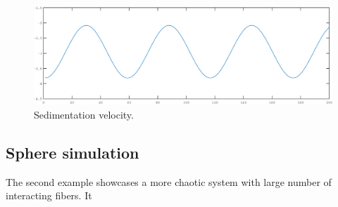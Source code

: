 \documentclass[a4paper,11pt]{kth-mag}
\begin{document}
\begin{figure}
  \centering
  \includegraphics[width=\textwidth]{img/ring_sedimentation.pdf}
  \caption{Sedimentation velocity.}
  \label{fig:ring_sedimentation_velocity}
\end{figure}

\subsection{Sphere simulation}
\label{subsec:example_sphere}

The second example showcases a more chaotic system with large number of interacting fibers. It 
\end{document}
